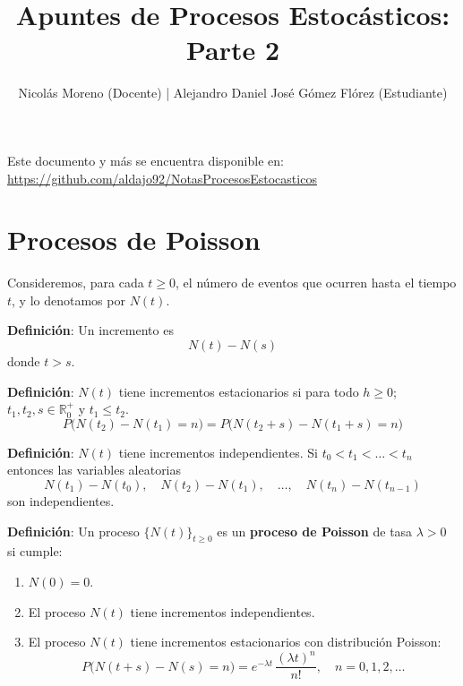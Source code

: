 \documentclass[12pt,a4paper]{article}
\title{Apuntes de Procesos Estocásticos: Parte 2}
\author{Nicolás Moreno (Docente) | Alejandro Daniel José Gómez Flórez (Estudiante)}
\date{}
\newcommand{\definicion}[1]{%
\begin{definicionbox}
\textbf{Definición}: #1
\end{definicionbox}
}
\begin{document}
\maketitle

Este documento y más se encuentra disponible en: \\
\url{https://github.com/aldajo92/NotasProcesosEstocasticos}

\section{Procesos de Poisson}

Consideremos, para cada $t \geq 0$, el número de eventos que ocurren hasta el tiempo $t$, y lo denotamos por $N(t)$.

\definicion{Un incremento es 
\begin{equation*}
N(t) - N(s)
\end{equation*}
donde $t > s$.}

\definicion{$N(t)$ tiene incrementos estacionarios si para todo $h \geq 0$; $t_1, t_2, s \in \mathbb{R}_{0}^+$ y $t_1 \leq t_{2}$.
\begin{equation*}
P\big(N(t_{2}) - N(t_{1}) = n\big) 
= P\big(N(t_{2}+s) - N(t_{1}+s) = n\big)
\end{equation*}}

\begin{center}
\end{center}

\definicion{$N(t)$ tiene incrementos independientes. Si $t_{0} < t_{1} < \dots < t_{n}$ entonces las variables aleatorias
\begin{equation*}
N(t_{1}) - N(t_{0}), \quad 
N(t_{2}) - N(t_{1}), \quad \dots, \quad 
N(t_{n}) - N(t_{n-1})
\end{equation*}
son independientes.}

\definicion{Un proceso $\{N(t)\}_{t \geq 0}$ es un \textbf{proceso de Poisson} de tasa $\lambda > 0$ si cumple:
\begin{enumerate}
    \item $N(0) = 0$.
    \item El proceso $N(t)$ tiene incrementos independientes.
    \item El proceso $N(t)$ tiene incrementos estacionarios con distribución Poisson:
    \begin{equation*}
    P\big(N(t+s) - N(s) = n\big) 
    = e^{-\lambda t} \, \frac{(\lambda t)^n}{n!}, 
    \quad n = 0,1,2,\dots
    \end{equation*}
\end{enumerate}}
\end{document}
